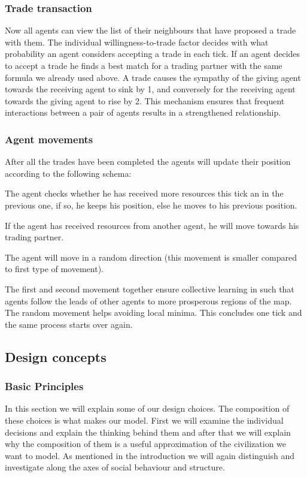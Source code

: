 \documentclass{JASSS}
\begin{document}
	
\subsubsection{Trade transaction}
	 Now all agents can view the list of their neighbours that have proposed a trade with them. The individual willingness-to-trade factor decides with what probability an agent considers accepting a trade in each tick. If an agent decides to accept a trade he finds a best match for a trading partner with the same formula we already used above. A trade causes the sympathy of the giving agent towards the receiving agent to sink by 1, and conversely for the receiving agent towards the giving agent to rise by 2. This mechanism ensures that frequent interactions between a pair of agents results in a strengthened relationship.\\

\subsubsection{Agent movements}
		After all the trades have been completed the agents will update their position according to the following schema:
\begin{enumerate*}
	\item
		The agent checks whether he has received more resources this tick an in the previous one, if so, he keeps his position, else he moves to his previous position.

	\item
		If the agent has received resources from another agent, he will move towards his trading partner.

	\item
		The agent will move in a random direction (this movement is smaller compared to first type of movement). 
\end{enumerate*}
The first and second movement together ensure collective learning in such that agents follow the leads of other agents to more prosperous regions of the map. The random movement helps avoiding local minima. This concludes one tick and the same process starts over again.


\subsection{Design concepts}

\subsubsection{Basic Principles}
	In this section we will explain some of our design choices. The composition of these choices is what makes our model. First we will examine the individual decisions and explain the thinking behind them and after that we will explain why the composition of them is a useful approximation of the civilization we want to model. As mentioned in the introduction we will again distinguish and investigate along the axes of social behaviour and structure.
	
\end{document}
